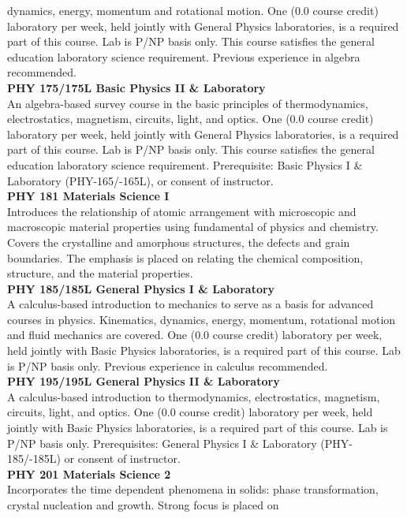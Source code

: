 \documentclass[
  letterpaper,
]{scrbook}
\begin{document}
dynamics, energy, momentum and rotational motion. One (0.0 course
credit) laboratory per week, held jointly with General Physics
laboratories, is a required part of this course. Lab is P/NP basis only.
This course satisfies the general education laboratory science
requirement. Previous experience in algebra recommended.\\
\textbf{PHY 175/175L Basic Physics II \& Laboratory}\\
An algebra-based survey course in the basic principles of
thermodynamics, electrostatics, magnetism, circuits, light, and optics.
One (0.0 course credit) laboratory per week, held jointly with General
Physics laboratories, is a required part of this course. Lab is P/NP
basis only. This course satisfies the general education laboratory
science requirement. Prerequisite: Basic Physics I \& Laboratory
(PHY-165/-165L), or consent of instructor.\\
\textbf{PHY 181 Materials Science I}\\
Introduces the relationship of atomic arrangement with microscopic and
macroscopic material properties using fundamental of physics and
chemistry. Covers the crystalline and amorphous structures, the defects
and grain boundaries. The emphasis is placed on relating the chemical
composition, structure, and the material properties.\\
\textbf{PHY 185/185L General Physics I \& Laboratory}\\
A calculus-based introduction to mechanics to serve as a basis for
advanced courses in physics. Kinematics, dynamics, energy, momentum,
rotational motion and fluid mechanics are covered. One (0.0 course
credit) laboratory per week, held jointly with Basic Physics
laboratories, is a required part of this course. Lab is P/NP basis only.
Previous experience in calculus recommended.\\
\textbf{PHY 195/195L General Physics II \& Laboratory}\\
A calculus-based introduction to thermodynamics, electrostatics,
magnetism, circuits, light, and optics. One (0.0 course credit)
laboratory per week, held jointly with Basic Physics laboratories, is a
required part of this course. Lab is P/NP basis only. Prerequisites:
General Physics I \& Laboratory (PHY-185/-185L) or consent of
instructor.\\
\textbf{PHY 201 Materials Science 2}\\
Incorporates the time dependent phenomena in solids: phase
transformation, crystal nucleation and growth. Strong focus is placed on
\end{document}
